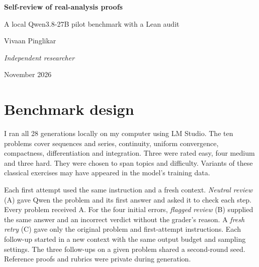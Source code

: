 \documentclass[11pt,letterpaper]{article}
\begin{document}
\begin{center}
  {\LARGE\bfseries Self-review of real-analysis proofs\par}
  \vspace{3pt}
  {\large A local Qwen3.8-27B pilot benchmark with a Lean audit\par}
  \vspace{7pt}
  {\large Vivaan Pinglikar\par}
  {\small\itshape Independent researcher\par}
  {\small November 2026\par}
\end{center}
\begin{abstract}
I tested whether asking Qwen to check a proof helped it correct mistakes.
On ten handpicked problems, a neutral request to review its work raised the
score from 6/10 to 8/10. Of the four first attempts graded incorrect, neutral
review repaired two, a fresh retry repaired one, and review with an explicit
error flag repaired none. A retrospective audit used Lean to check solutions
to all ten problems and retained all 28 prose grades. Every follow-up on an
initial error reached the output limit. The extra repair from neutral review
came from one problem.
\end{abstract}

\section{Benchmark design}
I ran all 28 generations locally on my computer using LM Studio. The ten
problems cover sequences and series, continuity, uniform convergence,
compactness, differentiation and integration. Three were rated easy, four
medium and three hard. They were chosen to span topics and difficulty.
Variants of these classical exercises may have appeared in the model's
training data.

Each first attempt used the same instruction and a fresh context. \emph{Neutral
review} (A) gave Qwen the problem and its first answer and asked it to check each
step. Every problem received A. For the four initial errors, \emph{flagged
review} (B) supplied the same answer and an incorrect verdict without the
grader's reason. A \emph{fresh retry} (C) gave only the original problem and
first-attempt instructions. Each follow-up started in a new context with the
same output budget and sampling settings. The three follow-ups on a given
problem shared a second-round seed. Reference proofs and rubrics were private
during generation.
\end{document}
